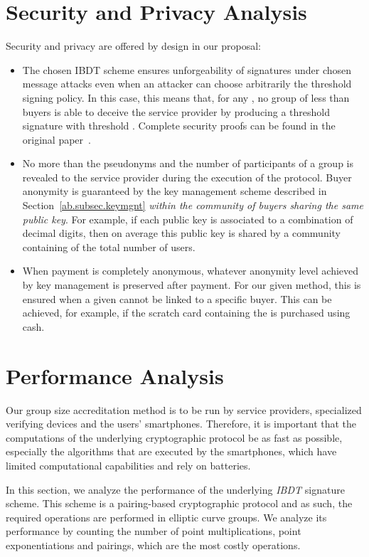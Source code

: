 \documentclass[11pt]{llncs}
\begin{document}
\section{Security and Privacy Analysis}\label{security}

Security and privacy are offered by design in our proposal:
\begin{itemize}
\item The chosen IBDT scheme ensures unforgeability of
signatures under chosen message attacks even when an 
attacker can choose arbitrarily the threshold signing policy. 
In this case, this means that, for any ,
no group of less than  buyers is able to deceive the
service provider by producing a threshold signature with
threshold . Complete security proofs can be found in
the original paper~\cite{ab.Herranz2012}.
\item No more than the pseudonyms and the number of participants of a group
is revealed to the service provider during the execution of the protocol. 
Buyer anonymity is guaranteed by the key management scheme
described in Section~\ref{ab.subsec.keymgnt} 
{\em within the community of buyers sharing the same public key}.
For example, if each public key is associated to a combination
of  decimal digits, then on average this public key
is shared by a community containing  of 
the total number of users.
\item When payment is completely anonymous, whatever anonymity
level achieved by key management is preserved after payment.
For our given method, this is ensured when a given 
cannot be linked to a specific buyer. This can be achieved, for example,
if the scratch card containing the  is purchased using
cash.
\end{itemize}

\section{Performance Analysis}\label{ab.sec.implementation}
Our group size accreditation method is to be run by service
providers, specialized verifying devices and the
users' smartphones.
Therefore, it is important that the computations of the
underlying cryptographic protocol be as fast as
possible, especially the algorithms that are executed
by the smartphones, which have limited computational
capabilities and rely on batteries.

In this section, we analyze the performance of the
underlying \emph{IBDT} signature scheme.
This scheme is a
pairing-based cryptographic protocol and
as such, the required operations are performed in elliptic
curve groups.
We analyze its performance by counting the number
of point multiplications, point exponentiations and
pairings, which are the most costly operations.
\end{document}
